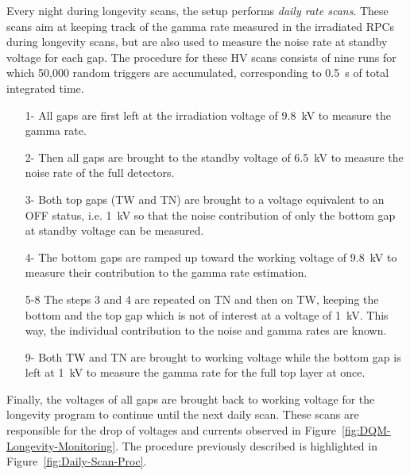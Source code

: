 	Every night during longevity scans, the setup performs \textit{daily rate scans}. These scans aim at keeping track of the gamma rate measured in the irradiated RPCs during longevity scans, but are also used to measure the noise rate at standby voltage for each gap. The procedure for these HV scans consists of nine runs for which 50,000 random triggers are accumulated, corresponding to \SI{0.5}{s} of total integrated time.
	
	\begin{itemize}
		\item[1-] All gaps are first left at the irradiation voltage of \SI{9.8}{kV} to measure the gamma rate.
		\item[2-] Then all gaps are brought to the standby voltage of \SI{6.5}{kV} to measure the noise rate of the full detectors.
		\item[3-] Both top gaps (TW and TN) are brought to a voltage equivalent to an OFF status, i.e. \SI{1}{kV} so that the noise contribution of only the bottom gap at standby voltage can be measured.
		\item[4-] The bottom gaps are ramped up toward the working voltage of \SI{9.8}{kV} to measure their contribution to the gamma rate estimation.
		\item[5-8] The steps 3 and 4 are repeated on TN and then on TW, keeping the bottom and the top gap which is not of interest at a voltage of \SI{1}{kV}. This way, the individual contribution to the noise and gamma rates are known.
		\item[9-] Both TW and TN are brought to working voltage while the bottom gap is left at \SI{1}{kV} to measure the gamma rate for the full top layer at once.
	\end{itemize}
	
	Finally, the voltages of all gaps are brought back to working voltage for the longevity program to continue until the next daily scan. These scans are responsible for the drop of voltages and currents observed in Figure~\ref{fig:DQM-Longevity-Monitoring}. The procedure previously described is highlighted in Figure~\ref{fig:Daily-Scan-Proc}. 
	
